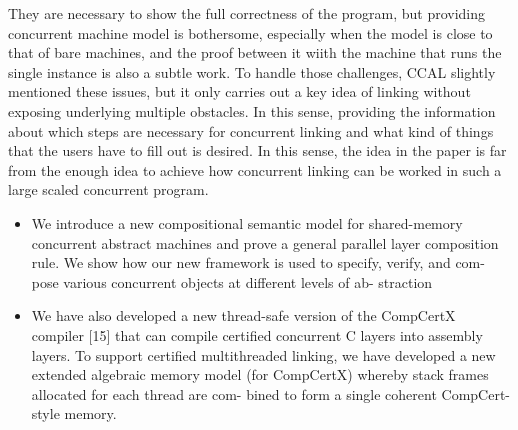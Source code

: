 They are necessary to show the full correctness of the program, 
but providing concurrent machine model is bothersome, especially when the model is close to that of bare machines, 
and the proof between it wiith the machine that runs the single instance is also a subtle work.
To handle those challenges,
CCAL slightly mentioned these issues,
but it only carries out
a key idea of
linking without exposing underlying multiple obstacles.  
In this sense, 
providing the information about which steps are necessary for concurrent linking and what kind of things that 
the users have to fill out is desired.
In this sense, the idea in the paper is far from 
the enough idea to achieve how 
concurrent linking can be worked in such 
a large scaled concurrent program. 



\begin{itemize}
\item We introduce a new compositional semantic model for shared-memory concurrent abstract machines and prove a general parallel layer composition rule. We show how our new framework is used to specify, verify, and com- pose various concurrent objects at different levels of ab- straction
\item  We have also developed a new thread-safe version of the CompCertX compiler [15] that can compile certified concurrent C layers into assembly layers. To support certified multithreaded linking, we have developed a new extended algebraic memory model (for CompCertX) whereby stack frames allocated for each thread are com- bined to form a single coherent CompCert-style memory.

\end{itemize}


%

